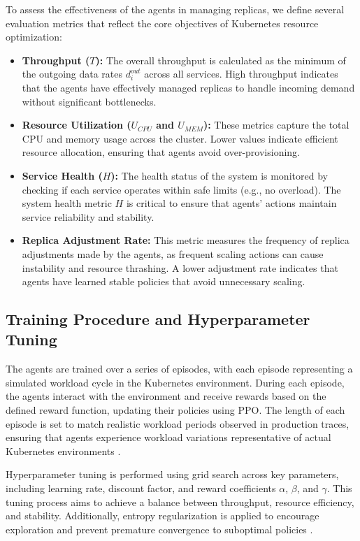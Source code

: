 \documentclass[conference]{IEEEtran}
\begin{document}
To assess the effectiveness of the agents in managing replicas, we define several evaluation metrics that reflect the core objectives of Kubernetes resource optimization:
\begin{itemize}
    \item \textbf{Throughput ($T$):} The overall throughput is calculated as the minimum of the outgoing data rates $d_i^{out}$ across all services. High throughput indicates that the agents have effectively managed replicas to handle incoming demand without significant bottlenecks.
    \item \textbf{Resource Utilization ($U_{CPU}$ and $U_{MEM}$):} These metrics capture the total CPU and memory usage across the cluster. Lower values indicate efficient resource allocation, ensuring that agents avoid over-provisioning.
    \item \textbf{Service Health ($H$):} The health status of the system is monitored by checking if each service operates within safe limits (e.g., no overload). The system health metric $H$ is critical to ensure that agents' actions maintain service reliability and stability.
    \item \textbf{Replica Adjustment Rate:} This metric measures the frequency of replica adjustments made by the agents, as frequent scaling actions can cause instability and resource thrashing. A lower adjustment rate indicates that agents have learned stable policies that avoid unnecessary scaling.
\end{itemize}

\subsection{Training Procedure and Hyperparameter Tuning}

The agents are trained over a series of episodes, with each episode representing a simulated workload cycle in the Kubernetes environment. During each episode, the agents interact with the environment and receive rewards based on the defined reward function, updating their policies using PPO. The length of each episode is set to match realistic workload periods observed in production traces, ensuring that agents experience workload variations representative of actual Kubernetes environments \cite{nguyen_sim2reality}.

Hyperparameter tuning is performed using grid search across key parameters, including learning rate, discount factor, and reward coefficients $\alpha$, $\beta$, and $\gamma$. This tuning process aims to achieve a balance between throughput, resource efficiency, and stability. Additionally, entropy regularization is applied to encourage exploration and prevent premature convergence to suboptimal policies \cite{schulman_ppo}.
\end{document}
